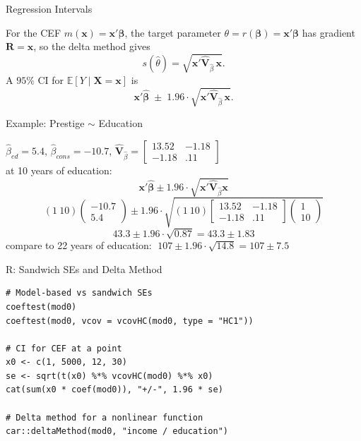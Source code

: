 \documentclass[aspectratio=169, handout, t]{beamer}
\numberwithin{equation}{section}
\begin{document}

\begin{frame}{Regression Intervals}

For the CEF $m(\bm{x}) = \bm{x}'\bm{\beta}$, the target parameter $\theta = r(\bm{\beta}) = \bm{x}'\bm{\beta}$ has gradient $\bm{R} = \bm{x}$, so the delta method gives
\[
s(\hat{\theta}) = \sqrt{\bm{x}' \hat{\bm{V}}_{\hat{\beta}}\, \bm{x}}.
\]
A $95\%$ CI for $\mathbb{E}[Y \mid \bm{X} = \bm{x}]$ is
\[
\bm{x}'\hat{\bm{\beta}} \;\pm\; 1.96 \cdot \sqrt{\bm{x}' \hat{\bm{V}}_{\hat{\beta}}\, \bm{x}}.
\]

\end{frame}


\begin{frame}{Example: Prestige $\sim$ Education}

$\hat{\beta}_{ed}=5.4$, $\hat{\beta}_{cons}=-10.7$,  $\hat{\bm{V}}_{\hat{\beta}}=\begin{bmatrix} 13.52&-1.18\\-1.18&.11\end{bmatrix}$\\
at 10 years of education:
$$\bm{x}' \hat{\bm{\beta}} \pm 1.96 \cdot \sqrt{\bm{x}' \hat{\bm{V}}_{\hat{\beta}} \bm{x}}$$
$$(1\ 10) \begin{pmatrix}-10.7\\ 5.4\end{pmatrix} \pm 1.96 \cdot \sqrt{(1\ 10) \begin{bmatrix} 13.52&-1.18\\-1.18&.11\end{bmatrix}\begin{pmatrix}1\\ 10\end{pmatrix}}$$
$$43.3 \pm 1.96 \cdot \sqrt{0.87} = 43.3 \pm 1.83$$
compare to 22 years of education: $\;107 \pm 1.96 \cdot \sqrt{14.8} = 107 \pm 7.5$
\end{frame}


\begin{frame}[fragile]{R: Sandwich SEs and Delta Method}

\begin{lstlisting}
# Model-based vs sandwich SEs
coeftest(mod0)
coeftest(mod0, vcov = vcovHC(mod0, type = "HC1"))

# CI for CEF at a point
x0 <- c(1, 5000, 12, 30)
se <- sqrt(t(x0) %*% vcovHC(mod0) %*% x0)
cat(sum(x0 * coef(mod0)), "+/-", 1.96 * se)

# Delta method for a nonlinear function
car::deltaMethod(mod0, "income / education")
\end{lstlisting}

\end{frame}
\end{document}
